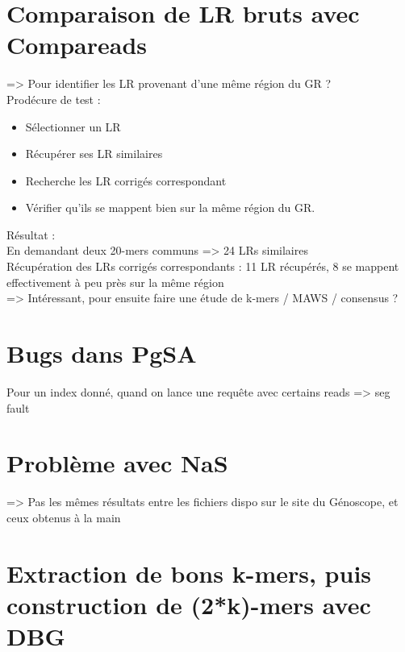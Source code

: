\documentclass[12pt]{article}
\begin{document}
\section{Comparaison de LR bruts avec Compareads}

=> Pour identifier les LR provenant d'une même région du GR ? \\

Prodécure de test : \\
\begin{itemize}
	\item Sélectionner un LR
	
	\item Récupérer ses LR similaires
	
	\item Recherche les LR corrigés correspondant
	
	\item Vérifier qu'ils se mappent bien sur la même région du GR.
\end{itemize}

Résultat :  \\ 

En demandant deux 20-mers communs => 24 LRs similaires \\
Récupération des LRs corrigés correspondants : 11 LR récupérés, 8 se mappent effectivement à peu près sur la même région \\

=> Intéressant, pour ensuite faire une étude de k-mers / MAWS / consensus ?

\section{Bugs dans PgSA}

Pour un index donné, quand on lance une requête avec certains reads => seg fault \\

\section{Problème avec NaS}

=> Pas les mêmes résultats entre les fichiers dispo sur le site du Génoscope, et ceux obtenus à la main

\section{Extraction de bons k-mers, puis construction de (2*k)-mers avec DBG}
\end{document}
